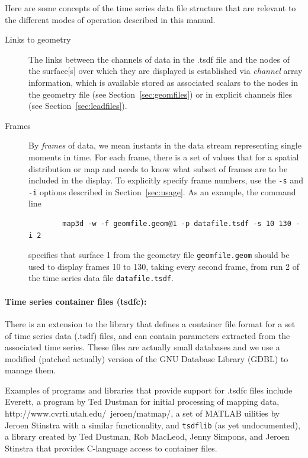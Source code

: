 Here are some concepts of the time series data file structure that are
relevant to the different modes of operation described in this manual.
%
\begin{description}
  \item [Links to geometry]  The
        links between the channels of data in the .tsdf file and the nodes
        of the surface[s] over which they are displayed is established via
        {\em channel\/} array information, which is available stored as
        associated scalars to the nodes in the geometry file (see
        Section~\ref{sec:geomfiles}) or in explicit channels files (see
        Section~\ref{sec:leadfiles}).
  \item [Frames]  By {\em frames\/} of data, we mean instants in the data
        stream representing single moments in time.  For each frame, there
        is a set of values that for a spatial distribution or map and
        \map{} needs to know what subset of frames are to be 
        included in the display.  To explicitly specify frame numbers, use
        the \texttt{-s} and \texttt{-i} options described in
        Section~\ref{sec:usage}.  As an example, the command line
\begin{verbatim}
        map3d -w -f geomfile.geom@1 -p datafile.tsdf -s 10 130 -i 2
\end{verbatim}
        specifies that surface 1 from the geometry file {\tt geomfile.geom}
        should be used to display frames 10 to 130, taking every second
        frame, from run 2 of the time series data file {\tt datafile.tsdf}.
\end{description}


\paragraph{Time series container files (tsdfc): } 
\label{sec:tsdfcfile}

There is an extension to the \graphicsio{} library that defines a container
file format for a set of time series data (.tsdf) files, and
can contain parameters extracted from the associated time series.  These
files are actually small databases and we use a modified (patched actually)
version of the GNU Database Library (GDBL) to manage them.  

Examples of programs and libraries that provide support for .tsdfc
files include Everett, a program by Ted Dustman for initial processing of
mapping data,  
{http://www.cvrti.utah.edu/~jeroen/matmap/}, a set of MATLAB uilities by
Jeroen Stinstra with a similar functionality, and \texttt{tsdflib} (as yet
undocumented), a library created by Ted Dustman, Rob MacLeod, Jenny
Simpons, and Jeroen Stinstra that provides C-language access to container
files.

